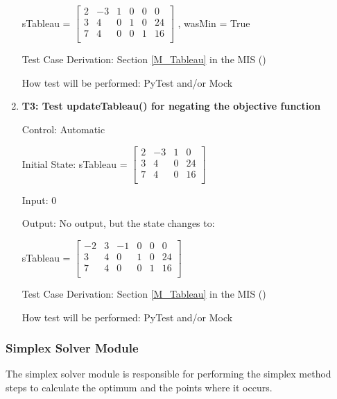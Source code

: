 \documentclass[12pt, titlepage]{article}
\begin{document}
\begin{enumerate}
	sTableau = $\begin{bmatrix}
	2 & -3 & 1 & 0 & 0 & 0\\
	3 & 4 & 0 & 1 & 0 & 24\\
	7 & 4 & 0 & 0 & 1 & 16\\
	\end{bmatrix}$ , wasMin = True
	
	Test Case Derivation: Section \ref{M_Tableau} in the MIS (\cite{losms-mis})
	
	How test will be performed: PyTest and/or Mock
	
	\item{\textbf{T3: Test updateTableau() for negating the objective function}}
	
	Control: Automatic 
	
	Initial State: sTableau = $\begin{bmatrix}
	2 & -3 & 1 & 0\\
	3 & 4 & 0 & 24\\
	7 & 4 & 0 & 16\\
	\end{bmatrix}$
	
	Input: 0
	
	Output: No output, but the state changes to:
	
	sTableau = $\begin{bmatrix}
	-2 & 3 & -1 & 0 & 0 & 0\\
	3 & 4 & 0 & 1 & 0 & 24\\
	7 & 4 & 0 & 0 & 1 & 16\\
	\end{bmatrix}$
	
	Test Case Derivation: Section \ref{M_Tableau} in the MIS (\cite{losms-mis})
	
	How test will be performed: PyTest and/or Mock
	

\end{enumerate}

\subsubsection{Simplex Solver Module}

The simplex solver module is responsible for performing the simplex method 
steps to calculate the optimum and the points where it occurs.
\end{document}
